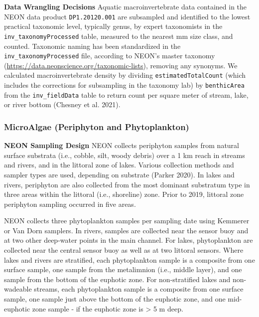 \documentclass[
  12pt,
]{article}
\begin{document}
\textbf{Data Wrangling Decisions} Aquatic macroinvertebrate data contained in the NEON data product \texttt{DP1.20120.001} are subsampled and identified to the lowest practical taxonomic level, typically genus, by expert taxonomists in the \texttt{inv\_taxonomyProcessed} table, measured to the nearest mm size class, and counted. Taxonomic naming has been standardized in the \texttt{inv\_taxonomyProcessed} file, according to NEON's master taxonomy (\url{https://data.neonscience.org/taxonomic-lists}), removing any synonyms. We calculated macroinvertebrate density by dividing \texttt{estimatedTotalCount} (which includes the corrections for subsampling in the taxonomy lab) by \texttt{benthicArea} from the \texttt{inv\_fieldData} table to return count per square meter of stream, lake, or river bottom (Chesney et al. 2021).

\hypertarget{microalgae-periphyton-and-phytoplankton}{%
\subsubsection{MicroAlgae (Periphyton and Phytoplankton)}\label{microalgae-periphyton-and-phytoplankton}}

\textbf{NEON Sampling Design} NEON collects periphyton samples from natural surface substrata (i.e., cobble, silt, woody debris) over a 1 km reach in streams and rivers, and in the littoral zone of lakes. Various collection methods and sampler types are used, depending on substrate (Parker 2020). In lakes and rivers, periphyton are also collected from the most dominant substratum type in three areas within the littoral (i.e., shoreline) zone. Prior to 2019, littoral zone periphyton sampling occurred in five areas.

NEON collects three phytoplankton samples per sampling date using Kemmerer or Van Dorn samplers. In rivers, samples are collected near the sensor buoy and at two other deep-water points in the main channel. For lakes, phytoplankton are collected near the central sensor buoy as well as at two littoral sensors. Where lakes and rivers are stratified, each phytoplankton sample is a composite from one surface sample, one sample from the metalimnion (i.e., middle layer), and one sample from the bottom of the euphotic zone. For non-stratified lakes and non-wadeable streams, each phytoplankton sample is a composite from one surface sample, one sample just above the bottom of the euphotic zone, and one mid-euphotic zone sample - if the euphotic zone is \textgreater{} 5 m deep.
\end{document}
